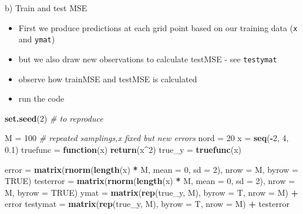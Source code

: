 \documentclass[ignorenonframetext,]{beamer}
\newenvironment{Shaded}{\begin{snugshade}}{\end{snugshade}}
\newcommand{\KeywordTok}[1]{\textcolor[rgb]{0.13,0.29,0.53}{\textbf{#1}}}
\newcommand{\DataTypeTok}[1]{\textcolor[rgb]{0.13,0.29,0.53}{#1}}
\newcommand{\DecValTok}[1]{\textcolor[rgb]{0.00,0.00,0.81}{#1}}
\newcommand{\FloatTok}[1]{\textcolor[rgb]{0.00,0.00,0.81}{#1}}
\newcommand{\StringTok}[1]{\textcolor[rgb]{0.31,0.60,0.02}{#1}}
\newcommand{\CommentTok}[1]{\textcolor[rgb]{0.56,0.35,0.01}{\textit{#1}}}
\newcommand{\OtherTok}[1]{\textcolor[rgb]{0.56,0.35,0.01}{#1}}
\newcommand{\ControlFlowTok}[1]{\textcolor[rgb]{0.13,0.29,0.53}{\textbf{#1}}}
\newcommand{\OperatorTok}[1]{\textcolor[rgb]{0.81,0.36,0.00}{\textbf{#1}}}
\newcommand{\NormalTok}[1]{#1}
\providecommand{\tightlist}{%
  \setlength{\itemsep}{0pt}\setlength{\parskip}{0pt}}
\begin{document}
\begin{frame}[fragile]

\begin{block}{b) Train and test MSE}

\begin{itemize}
\tightlist
\item
  First we produce predictions at each grid point based on our training
  data (\texttt{x} and \texttt{ymat})
\item
  but we also draw new observations to calculate testMSE - see
  \texttt{testymat}
\item
  observe how trainMSE and testMSE is calculated
\item
  run the code
\end{itemize}

\begin{Shaded}
\begin{Highlighting}[]
\KeywordTok{set.seed}\NormalTok{(}\DecValTok{2}\NormalTok{)  }\CommentTok{# to reproduce}

\NormalTok{M =}\StringTok{ }\DecValTok{100}  \CommentTok{# repeated samplings,x fixed but new errors}
\NormalTok{nord =}\StringTok{ }\DecValTok{20}
\NormalTok{x =}\StringTok{ }\KeywordTok{seq}\NormalTok{(}\OperatorTok{-}\DecValTok{2}\NormalTok{, }\DecValTok{4}\NormalTok{, }\FloatTok{0.1}\NormalTok{)}
\NormalTok{truefunc =}\StringTok{ }\ControlFlowTok{function}\NormalTok{(x) }\KeywordTok{return}\NormalTok{(x}\OperatorTok{^}\DecValTok{2}\NormalTok{)}
\NormalTok{true_y =}\StringTok{ }\KeywordTok{truefunc}\NormalTok{(x)}

\NormalTok{error =}\StringTok{ }\KeywordTok{matrix}\NormalTok{(}\KeywordTok{rnorm}\NormalTok{(}\KeywordTok{length}\NormalTok{(x) }\OperatorTok{*}\StringTok{ }\NormalTok{M, }\DataTypeTok{mean =} \DecValTok{0}\NormalTok{, }\DataTypeTok{sd =} \DecValTok{2}\NormalTok{), }\DataTypeTok{nrow =}\NormalTok{ M, }\DataTypeTok{byrow =} \OtherTok{TRUE}\NormalTok{)}
\NormalTok{testerror =}\StringTok{ }\KeywordTok{matrix}\NormalTok{(}\KeywordTok{rnorm}\NormalTok{(}\KeywordTok{length}\NormalTok{(x) }\OperatorTok{*}\StringTok{ }\NormalTok{M, }\DataTypeTok{mean =} \DecValTok{0}\NormalTok{, }\DataTypeTok{sd =} \DecValTok{2}\NormalTok{), }\DataTypeTok{nrow =}\NormalTok{ M, }
    \DataTypeTok{byrow =} \OtherTok{TRUE}\NormalTok{)}
\NormalTok{ymat =}\StringTok{ }\KeywordTok{matrix}\NormalTok{(}\KeywordTok{rep}\NormalTok{(true_y, M), }\DataTypeTok{byrow =}\NormalTok{ T, }\DataTypeTok{nrow =}\NormalTok{ M) }\OperatorTok{+}\StringTok{ }\NormalTok{error}
\NormalTok{testymat =}\StringTok{ }\KeywordTok{matrix}\NormalTok{(}\KeywordTok{rep}\NormalTok{(true_y, M), }\DataTypeTok{byrow =}\NormalTok{ T, }\DataTypeTok{nrow =}\NormalTok{ M) }\OperatorTok{+}\StringTok{ }\NormalTok{testerror}


\end{Highlighting}
\end{Shaded}
\end{block}
\end{frame}
\end{document}
